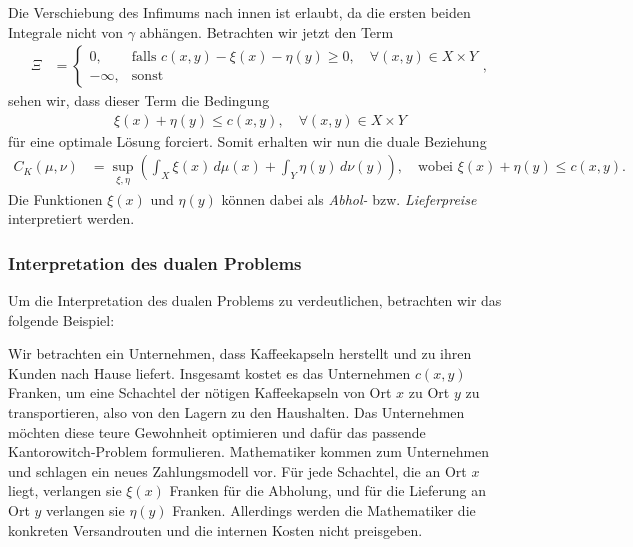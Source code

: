 Die Verschiebung des Infimums nach innen ist erlaubt,
da die ersten beiden Integrale nicht von $\gamma$ abhängen.
Betrachten wir jetzt den Term
\begin{align*}
\Xi
&=
\begin{cases}
0,
& \text{falls } c(x,y) - \xi(x) - \eta(y) \geq 0
,\quad\forall (x,y) \in X \times Y
\\
-\infty,
& \text{sonst}
\end{cases}
,
\end{align*}
sehen wir,
dass dieser Term die Bedingung
\begin{align*}
\xi(x) + \eta(y) \leq c(x,y)
,\quad
\forall (x,y) \in X \times Y
\end{align*}
für eine optimale Lösung forciert.
Somit erhalten wir nun die duale Beziehung
\begin{align*}
C_K(\mu, \nu)
&=
\sup_{\xi, \eta}
\left(
\int_X \xi(x)\, d\mu(x)
+ \int_Y \eta(y)\, d\nu(y)
\right)
,\quad\text{wobei }
\xi(x) + \eta(y) \leq c(x,y)
.
\end{align*}
Die Funktionen $\xi(x)$ und $\eta(y)$ können dabei als
\emph{Abhol-} bzw. \emph{Lieferpreise} interpretiert werden.
%
%

\subsubsection{Interpretation des dualen Problems}
Um die Interpretation des dualen Problems zu verdeutlichen,
betrachten wir das folgende Beispiel:

Wir betrachten ein Unternehmen,
dass Kaffeekapseln herstellt und zu ihren Kunden nach Hause liefert.
%
Insgesamt kostet es das Unternehmen $c(x,y)$ Franken,
um eine Schachtel der nötigen Kaffeekapseln von Ort $x$ zu Ort $y$ zu transportieren,
also von den Lagern zu den Haushalten.
%
%
Das Unternehmen möchten diese teure Gewohnheit optimieren und
dafür das passende Kantorowitch-Problem formulieren.
Mathematiker kommen zum Unternehmen und schlagen ein neues Zahlungsmodell vor.
Für jede Schachtel,
die an Ort $x$ liegt,
verlangen sie $\xi(x)$ Franken für die Abholung,
und für die Lieferung an Ort $y$ verlangen sie $\eta(y)$ Franken.
Allerdings werden die Mathematiker die konkreten Versandrouten und 
die internen Kosten nicht preisgeben.

